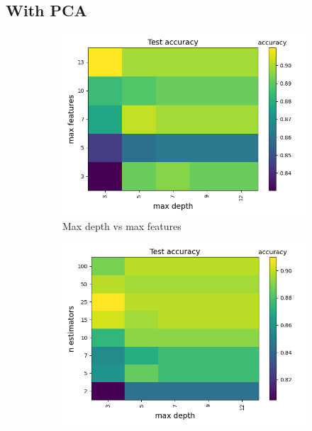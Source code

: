 \documentclass[a4paper]{article}
\begin{document}
\subsection{With PCA}

\begin{figure}[H]
  \centering
  \begin{subfigure}{0.49\textwidth}
    \includegraphics[scale=0.45]{../figures/random_forest/heatmaps/heatmap_nbins200_pca35_seed4155_ts0.20_accuracy_max_depth_max_features.png}
    \caption{Max depth vs max features}
  \end{subfigure}
  \begin{subfigure}{0.49\textwidth}
    \includegraphics[scale=0.45]{../figures/random_forest/heatmaps/heatmap_nbins200_pca35_seed4155_ts0.20_accuracy_max_depth_n_estimators.png}

\end{subfigure}
\end{figure}
\end{document}
